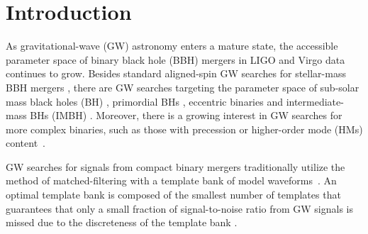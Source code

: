\documentclass[twocolumn,showpacs,preprintnumbers,nofootinbib,prd,
superscriptaddress,10pt]{revtex4-2}
\begin{document}
	\author{Sarah }
	\maketitle
\section{Introduction}

As gravitational-wave (GW) astronomy enters a mature state, the accessible parameter space of binary black hole (BBH) mergers in LIGO \cite{LIGOScientific:2014pky} and Virgo \cite{VIRGO:2014yos} data continues to grow. Besides standard aligned-spin GW searches for stellar-mass BBH mergers \cite{GWTC-1,GWTC-2,GWTC-2.1, GWTC-3}, there are GW searches targeting the parameter space of sub-solar mass black holes (BH) \cite{SSM_O2, SSM_O3a, PhysRevD.106.023024, Nitz:2021mzz}, primordial BHs \cite{PBH}, eccentric binaries \cite{PhysRevD.102.043005, PhysRevD.104.104016, Nitz:2019spj, LIGOScientific:2019dag, Ramos-Buades:2020eju, Wang:2021qsu, Nitz:2021mzz} and intermediate-mass BHs (IMBH) \cite{IMBH_O2, IMBH_O3, Chandra:2022ixv}. Moreover, there is a growing interest in GW searches for more complex binaries, such as those with precession \cite{PhysRevD.89.024010, Harry:2017weg, PhysRevD.102.041302, Indik:2016qky, Harry:2016ijz, Fairhurst:2019vut, McIsaac:2023ijd} or higher-order mode (HMs) content~\cite{CalderonBustillo:2015lrt, Harry:2017weg, Chandra_hom, 2021PhRvD.103b4042M}.

GW searches for signals from compact binary mergers traditionally utilize the method of matched-filtering with a template bank of model waveforms~\cite{Sathyaprakash:1991mt, Dhurandhar:1992mw, Owen:1998dk, Allen:2005fk, Babak:2006ty, Cokelaer:2007mv}.
An optimal template bank is composed of the smallest number of templates that guarantees that only a small fraction of signal-to-noise ratio from GW signals is missed due to the discreteness of the template bank \cite{Prix:2007ks}.
\end{document}
